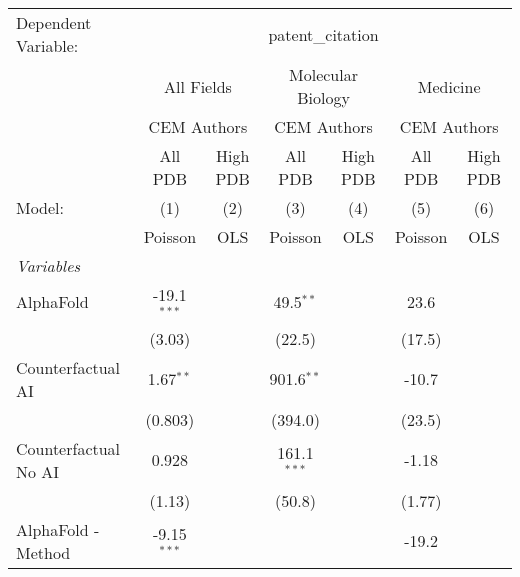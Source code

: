 \begingroup
\centering
\begin{tabular}{lcccccc}
   \tabularnewline \midrule \midrule
   Dependent Variable: & \multicolumn{6}{c}{patent\_citation}\\
 & \multicolumn{2}{c}{All Fields} & \multicolumn{2}{c}{Molecular Biology} & \multicolumn{2}{c}{Medicine} \\
\cmidrule(lr){2-3} \cmidrule(lr){4-5} \cmidrule(lr){6-7}
 & \multicolumn{2}{c}{CEM Authors} & \multicolumn{2}{c}{CEM Authors} & \multicolumn{2}{c}{CEM Authors} \\
\cmidrule(lr){2-3} \cmidrule(lr){4-5} \cmidrule(lr){6-7}
 & \multicolumn{1}{c}{All PDB} & \multicolumn{1}{c}{High PDB} & \multicolumn{1}{c}{All PDB} & \multicolumn{1}{c}{High PDB} & \multicolumn{1}{c}{All PDB} & \multicolumn{1}{c}{High PDB} \\
\cmidrule(lr){2-2} \cmidrule(lr){3-3} \cmidrule(lr){4-4} \cmidrule(lr){5-5} \cmidrule(lr){6-6} \cmidrule(lr){7-7}
   Model:                                                     & (1)           & (2)  & (3)           & (4)  & (5)           & (6)\\  
                                                              &  Poisson      & OLS  & Poisson       & OLS  & Poisson       & OLS\\  
   \midrule
   \emph{Variables}\\
   AlphaFold                                                  & -19.1$^{***}$ &      & 49.5$^{**}$   &      & 23.6          &   \\   
                                                              & (3.03)        &      & (22.5)        &      & (17.5)        &   \\   
   Counterfactual AI                                          & 1.67$^{**}$   &      & 901.6$^{**}$  &      & -10.7         &   \\   
                                                              & (0.803)       &      & (394.0)       &      & (23.5)        &   \\   
   Counterfactual No AI                                       & 0.928         &      & 161.1$^{***}$ &      & -1.18         &   \\   
                                                              & (1.13)        &      & (50.8)        &      & (1.77)        &   \\   
   AlphaFold - Method                                         & -9.15$^{***}$ &      &               &      & -19.2         &   \\   

\end{tabular}

